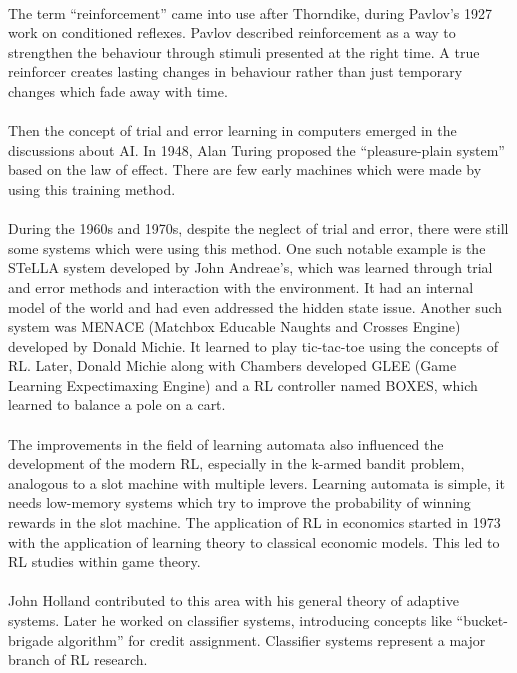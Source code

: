 \documentclass{article}
\begin{document}
    \paragraph{}The term “reinforcement” came into use after Thorndike, during Pavlov's 1927 work on conditioned reflexes. Pavlov described reinforcement as a way to strengthen the behaviour through stimuli presented at the right time. A true reinforcer creates lasting changes in behaviour rather than just temporary changes which fade away with time.
    \paragraph{}Then the concept of trial and error learning in computers emerged in the discussions about AI. In 1948, Alan Turing proposed the “pleasure-plain system” based on the law of effect. There are few early machines which were made by using this training method. 
    \paragraph{}During the 1960s and 1970s, despite the neglect of trial and error, there were still some systems which were using this method. One such notable example is the STeLLA system developed by John Andreae’s, which was learned through trial and error methods and interaction with the environment. It had an internal model of the world and had even addressed the hidden state issue. Another such system was MENACE (Matchbox Educable Naughts and Crosses Engine) developed by Donald Michie. It learned to play tic-tac-toe using the concepts of RL. Later, Donald Michie along with Chambers developed GLEE (Game Learning Expectimaxing Engine) and a RL controller named BOXES, which learned to balance a pole on a cart.
    \paragraph{}The improvements in the field of learning automata also influenced the development of the modern RL, especially in the k-armed bandit problem, analogous to a slot machine with multiple levers. Learning automata is simple, it needs low-memory systems which try to improve the probability of winning rewards in the slot machine. The application of RL in economics started in 1973 with the application of learning theory to classical economic models. This led to RL studies within game theory.
    \paragraph{}John Holland contributed to this area with his general theory of adaptive systems. Later he worked on classifier systems, introducing concepts like “bucket-brigade algorithm” for credit assignment. Classifier systems represent a major branch of RL research.
\end{document}

